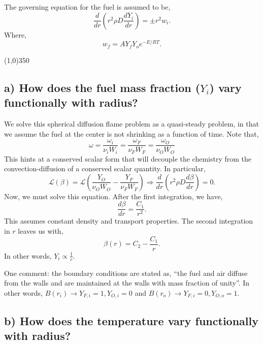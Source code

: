 \documentclass{article}
\begin{document}
The governing equation for the fuel is assumed to be, 
\begin{equation*}
 \frac{d}{dr}\left( r^2 \rho D \frac{dY_i}{dr}\right) = \pm r^2 w_i. 
\end{equation*}
Where, 
\begin{equation*}
 w_f = A Y_f Y_o e^{-E/RT}.
\end{equation*}
\begin{center}
\line(1,0){350}
\end{center}
\subsection*{a) How does the fuel mass fraction ($Y_i$) vary functionally
  with radius?}
We solve this spherical diffusion flame problem as a quasi-steady
problem, in that we assume the fuel at the center is not shrinking as a
function of time. Note that, 
\begin{equation*}
\omega = \frac{\omega_i}{\nu_i W_i}= \frac{\omega_F}{\nu_F W_F} =
 \frac{\omega_O}{\nu_O W_O} 
\end{equation*}
This hints at a conserved scalar form that will
decouple the chemistry from the convection-diffusion of a conserved
scalar quantity. In particular, 
\begin{equation*}
\mathcal{L}\left(\beta \right) = \mathcal{L}\left( \frac{Y_O}{\nu_O W_O}
	    - \frac{Y_F}{\nu_F W_F} \right) \Rightarrow \frac{d}{dr}\left( r^2
	    \rho D \frac{d \beta}{dr}\right) = 0 .
\end{equation*}
Now, we must solve this equation. After the first integration, we have, 
\begin{equation*}
\frac{d \beta}{dr} = \frac{C_1}{r^2 }.
\end{equation*}
This assumes constant density and transport properties. The second
integration in $r$ leaves us with, 
\begin{equation*}
\beta(r) = C_2 - \frac{C_1}{ r }.
\end{equation*}
In other words, $Y_i \propto \frac{1}{r} $. 

One comment: the boundary conditions are stated as, ``the fuel and air
 diffuse from the walls and are maintained at the walls with mass
 fraction of unity''. In other words, $B(r_i) \rightarrow Y_{F,i} = 1, Y_{O,i} =
 0 $ and $B(r_o) \rightarrow Y_{F,i} = 0, Y_{O,o} = 1$. 

\subsection*{b) How does the temperature vary functionally with radius?}
\end{document}
